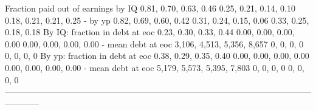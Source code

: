    Fraction paid out of earnings by IQ      0.81, 0.70, 0.63, 0.46     0.25, 0.21, 0.14, 0.10     0.18, 0.21, 0.21, 0.25
                               - by yp      0.82, 0.69, 0.60, 0.42     0.31, 0.24, 0.15, 0.06     0.33, 0.25, 0.18, 0.18
        By IQ: fraction in debt at eoc      0.23, 0.30, 0.33, 0.44     0.00, 0.00, 0.00, 0.00     0.00, 0.00, 0.00, 0.00
                    - mean debt at eoc  3,106, 4,513, 5,356, 8,657                 0, 0, 0, 0                 0, 0, 0, 0
        By yp: fraction in debt at eoc      0.38, 0.29, 0.35, 0.40     0.00, 0.00, 0.00, 0.00     0.00, 0.00, 0.00, 0.00
                    - mean debt at eoc  5,179, 5,573, 5,395, 7,803                 0, 0, 0, 0                 0, 0, 0, 0
------------------------------------------------------------------------------------------------------------------------
